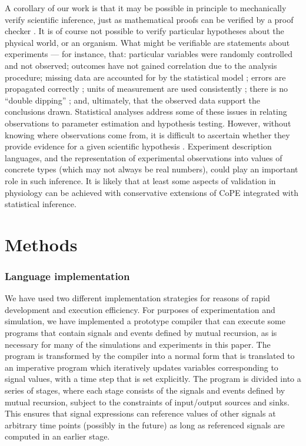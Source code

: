 A corollary of our work is that it may be possible in principle to
mechanically verify scientific inference, just as mathematical proofs
can be verified by a proof checker \cite{DeBruijn1968,
  Harrison2009}. It is of course not possible to verify particular
hypotheses about the physical world, or an organism. What might be
verifiable are statements about experiments --- for instance, that:
particular variables were randomly controlled and not observed;
outcomes have not gained correlation due to the analysis procedure;
missing data are accounted for by the statistical model
\cite{Gelman2003}; errors are propagated correctly \cite{Taylor1997};
units of measurement are used consistently \cite{Kennedy1997}; there
is no ``double dipping'' \cite{Kriegeskorte2009}; and, ultimately,
that the observed data support the conclusions drawn. Statistical
analyses address some of these issues in relating observations to
parameter estimation and hypothesis testing. However, without knowing
where observations come from, it is difficult to ascertain whether
they provide evidence for a given scientific hypothesis
\cite{Pool2002}. Experiment description languages, and the
representation of experimental observations into values of concrete
types (which may not always be real numbers), could play an important
role in such inference. It is likely that at least some
aspects of validation in physiology can be achieved with conservative
extensions of
CoPE integrated with statistical inference.

\section*{Methods}

\subsubsection*{Language implementation} 

We have used two different implementation strategies for reasons of
rapid development and execution efficiency. For purposes of
experimentation and simulation, we have implemented a prototype
compiler that can execute some programs that contain signals and
events defined by mutual recursion, as is necessary for many of the
simulations and experiments in this paper. The program is transformed
by the compiler into a normal form that is translated to an imperative
program which iteratively updates variables corresponding to signal
values, with a time step that is set explicitly. The program is
divided into a series of stages, where each stage consists of the
signals and events defined by mutual recursion, subject to the
constraints of input/output sources and sinks. This ensures that
signal expressions can reference values of other signals at arbitrary
time points (possibly in the future) as long as referenced signals are
computed in an earlier stage.

